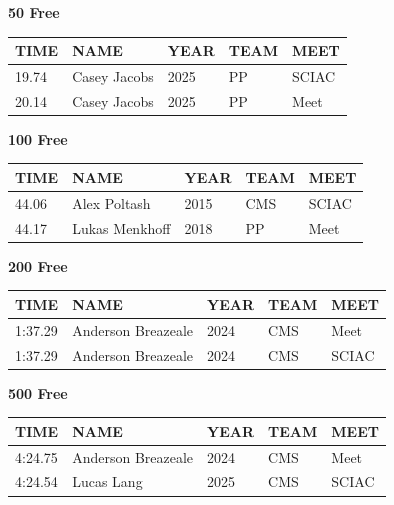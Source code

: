 \begin{table}[H]
\centering
\begin{minipage}[t]{0.48\textwidth}
\centering
\textbf{50 Free}\\[0.1cm]
\begin{tabular}{@{}p{1.8cm}p{2.8cm}p{1.2cm}p{1.4cm}p{1.4cm}@{}}
\hline
    \textbf{TIME} & \textbf{NAME} & \textbf{YEAR} & \textbf{TEAM} & \textbf{MEET} \\
\hline
    19.74 & Casey Jacobs & 2025 & PP & SCIAC \\
    20.14 & Casey Jacobs & 2025 & PP & Meet \\
\hline
\end{tabular}
\end{minipage}\hfill
\begin{minipage}[t]{0.48\textwidth}
\centering
\textbf{100 Free}\\[0.1cm]
\begin{tabular}{@{}p{1.8cm}p{2.8cm}p{1.2cm}p{1.4cm}p{1.4cm}@{}}
\hline
    \textbf{TIME} & \textbf{NAME} & \textbf{YEAR} & \textbf{TEAM} & \textbf{MEET} \\
\hline
    44.06 & Alex Poltash & 2015 & CMS & SCIAC \\
    44.17 & Lukas Menkhoff & 2018 & PP & Meet \\
\hline
\end{tabular}
\end{minipage}
\end{table}

\begin{table}[H]
\centering
\begin{minipage}[t]{0.48\textwidth}
\centering
\textbf{200 Free}\\[0.1cm]
\begin{tabular}{@{}p{1.8cm}p{2.8cm}p{1.2cm}p{1.4cm}p{1.4cm}@{}}
\hline
    \textbf{TIME} & \textbf{NAME} & \textbf{YEAR} & \textbf{TEAM} & \textbf{MEET} \\
\hline
    1:37.29 & Anderson Breazeale & 2024 & CMS & Meet \\
    1:37.29 & Anderson Breazeale & 2024 & CMS & SCIAC \\
\hline
\end{tabular}
\end{minipage}\hfill
\begin{minipage}[t]{0.48\textwidth}
\centering
\textbf{500 Free}\\[0.1cm]
\begin{tabular}{@{}p{1.8cm}p{2.8cm}p{1.2cm}p{1.4cm}p{1.4cm}@{}}
\hline
    \textbf{TIME} & \textbf{NAME} & \textbf{YEAR} & \textbf{TEAM} & \textbf{MEET} \\
\hline
    4:24.75 & Anderson Breazeale & 2024 & CMS & Meet \\
    4:24.54 & Lucas Lang & 2025 & CMS & SCIAC \\
\hline
\end{tabular}
\end{minipage}
\end{table}

